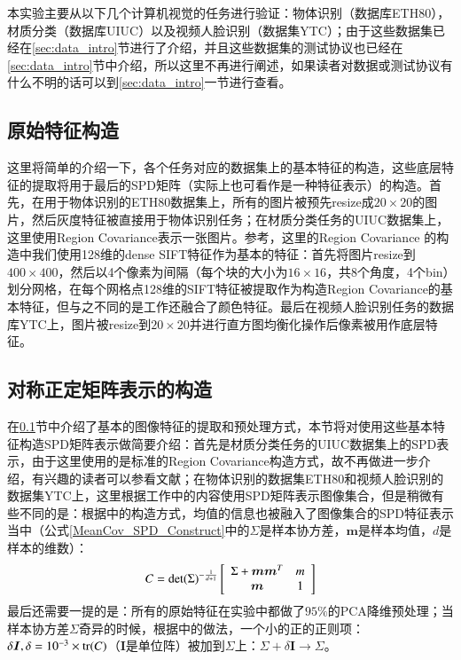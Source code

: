 本实验主要从以下几个计算机视觉的任务进行验证：物体识别（数据库ETH80\cite{Database_ETH80}），材质分类（数据库UIUC\cite{Database_UIUC}）以及视频人脸识别（数据集YTC\cite{Database_YTC}）；由于这些数据集已经在\ref{sec:data_intro}节进行了介绍，并且这些数据集的测试协议也已经在\ref{sec:data_intro}节中介绍，所以这里不再进行阐述，如果读者对数据或测试协议有什么不明的话可以到\ref{sec:data_intro}一节进行查看。
\subsection{原始特征构造}
\label{Database_feature}
这里将简单的介绍一下，各个任务对应的数据集上的基本特征的构造，这些底层特征的提取将用于最后的SPD矩阵（实际上也可看作是一种特征表示）的构造。首先，在用于物体识别的ETH80\cite{Database_ETH80}数据集上，所有的图片被预先resize成$20\times 20$的图片，然后灰度特征被直接用于物体识别任务；在材质分类任务的UIUC\cite{Database_UIUC}数据集上，这里使用Region Covariance\cite{RegionCov}表示一张图片。参考\cite{Statistics_SPDML}，这里的Region Covariance 的构造中我们使用128维的dense SIFT\cite{SIFT}特征作为基本的特征：首先将图片resize到$400\times400$，然后以4个像素为间隔（每个块的大小为$16 \times 16$，共8个角度，4个bin）划分网格，在每个网格点128维的SIFT特征被提取作为构造Region Covariance的基本特征，但与之不同的是工作\cite{Statistics_SPDML}还融合了颜色特征。最后在视频人脸识别任务的数据库YTC\cite{Database_YTC}上，图片被resize到$20\times 20$并进行直方图均衡化操作后像素被用作底层特征。
\subsection{对称正定矩阵表示的构造}
\label{sec:Database_SPD_Construct}
在\ref{Database_feature}节中介绍了基本的图像特征的提取和预处理方式，本节将对使用这些基本特征构造SPD矩阵表示做简要介绍：首先是材质分类任务的UIUC\cite{Database_UIUC}数据集上的SPD表示，由于这里使用的是标准的Region Covariance\cite{RegionCov}构造方式，故不再做进一步介绍，有兴趣的读者可以参看文献\cite{RegionCov}；在物体识别的数据集ETH80\cite{Database_ETH80}和视频人脸识别的数据集YTC\cite{Database_YTC}上，这里根据工作\cite{Statistics_CDL}中的内容使用SPD矩阵表示图像集合，但是稍微有些不同的是：根据\cite{Statistics_HERML,Statistics_DARG}中的构造方式，均值的信息也被融入了图像集合的SPD特征表示当中（公式\ref{MeanCov_SPD_Construct}中的$\Sigma$是样本协方差，$\bm{m}$是样本均值，$d$是样本的维数）：
\begin{equation}
\label{MeanCov_SPD_Construct}
C={\rm det}(\Sigma)^{-\frac{1}{d+1}}\left[
\begin{array}{cc}
\Sigma+\bm{m}\bm{m}^{T}&m\\
\bm{m}&1
\end{array}
\right]
\end{equation}
最后还需要一提的是：所有的原始特征在实验中都做了$95\%$的PCA降维预处理；当样本协方差$\Sigma$奇异的时候，根据\cite{Statistics_DARG,Statistics_LEML}中的做法，一个小的正的正则项：$\delta\bm{I},\delta=10^{-3}\times {\rm tr}(C)$（$\bm{I}$是单位阵）被加到$\Sigma$上：$\Sigma+\delta\bm{I}\rightarrow \Sigma$。
